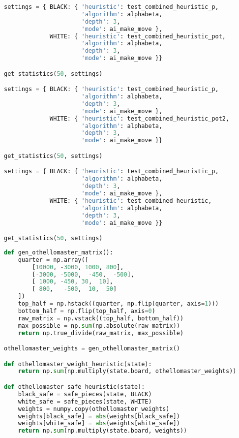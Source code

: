 \begin{lstlisting}[language=Python]
settings = { BLACK: { 'heuristic': test_combined_heuristic_p,
                      'algorithm': alphabeta,
                      'depth': 3,
                      'mode': ai_make_move },
             WHITE: { 'heuristic': test_combined_heuristic_pot,
                      'algorithm': alphabeta,
                      'depth': 3,
                      'mode': ai_make_move }}

get_statistics(50, settings)

settings = { BLACK: { 'heuristic': test_combined_heuristic_p,
                      'algorithm': alphabeta,
                      'depth': 3,
                      'mode': ai_make_move },
             WHITE: { 'heuristic': test_combined_heuristic_pot2,
                      'algorithm': alphabeta,
                      'depth': 3,
                      'mode': ai_make_move }}

get_statistics(50, settings)

settings = { BLACK: { 'heuristic': test_combined_heuristic_p,
                      'algorithm': alphabeta,
                      'depth': 3,
                      'mode': ai_make_move },
             WHITE: { 'heuristic': test_combined_heuristic,
                      'algorithm': alphabeta,
                      'depth': 3,
                      'mode': ai_make_move }}

get_statistics(50, settings)
\end{lstlisting}

\begin{lstlisting}[language=Python]
def gen_othellomaster_matrix():
    quarter = np.array([
        [10000, -3000, 1000, 800],
        [-3000, -5000,  -450,  -500],
        [ 1000, -450, 30,  10],
        [ 800,   -500,  10,  50]
    ])
    top_half = np.hstack((quarter, np.flip(quarter, axis=1)))
    bottom_half = np.flip(top_half, axis=0)
    raw_matrix = np.vstack((top_half, bottom_half))
    max_possible = np.sum(np.absolute(raw_matrix))
    return np.true_divide(raw_matrix, max_possible)

othellomaster_weights = gen_othellomaster_matrix()

def othellomaster_weight_heuristic(state):
    return np.sum(np.multiply(state.board, othellomaster_weights))

def othellomaster_safe_heuristic(state):
    black_safe = safe_pieces(state, BLACK)
    white_safe = safe_pieces(state, WHITE)
    weights = numpy.copy(othellomaster_weights)
    weights[black_safe] = abs(weights[black_safe])
    weights[white_safe] = abs(weights[white_safe])
    return np.sum(np.multiply(state.board, weights))
\end{lstlisting}

